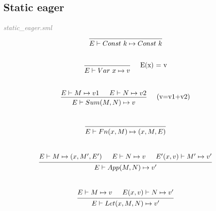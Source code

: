 \documentclass[a4paper]{article}
\begin{document}
	\subsection{Static eager}
	\textit{\textcolor{gray}{static\_eager.sml}} \\
	\[
		\begin{prooftree}
			\hypo{}
			\infer1[]{E \vdash Const \ k \mapsto Const \ k}
		\end{prooftree}
	\]
	\\
	\[
		\begin{prooftree}
			\hypo{}
			\infer1[\quad E(x) = v]{E \vdash Var \ x \mapsto v}
		\end{prooftree}
	\]
	\\
	\[
		\begin{prooftree}
			\hypo{E \vdash M \mapsto v1}
			\hypo{E \vdash N \mapsto v2 }
			\infer2[\quad (v=v1+v2)]{E \vdash Sum(M, N) \mapsto v}
		\end{prooftree}
	\]
	\\
	\[
		\begin{prooftree}
			\hypo{}
			\infer1[]{E \vdash Fn(x, M) \mapsto (x, M, E)}
		\end{prooftree}
	\]
	\\
	\[
		\begin{prooftree}
			\hypo{E \vdash M \mapsto (x, M', E')}
			\hypo{E \vdash N \mapsto v}
			\hypo{E'(x, v) \vdash M' \mapsto v'}
			\infer3[]{E \vdash App(M, N) \mapsto v'}
		\end{prooftree}
	\]
	\\
	\[
		\begin{prooftree}
			\hypo{E \vdash M \mapsto v}
			\hypo{E(x, v) \vdash N \mapsto v'}
			\infer2[]{E \vdash Let(x, M, N) \mapsto v' }
		\end{prooftree}
	\]
\end{document}
